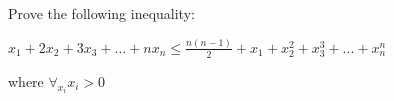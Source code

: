 Prove the following inequality:

$x_1 + 2x_2 + 3x_3 + ... + nx_n \leq \frac{n(n-1)}{2} + x_1 + x_2 ^2 + x_3 ^3 + ... + x_n ^n$

where $\forall _{x_i} x_i > 0$